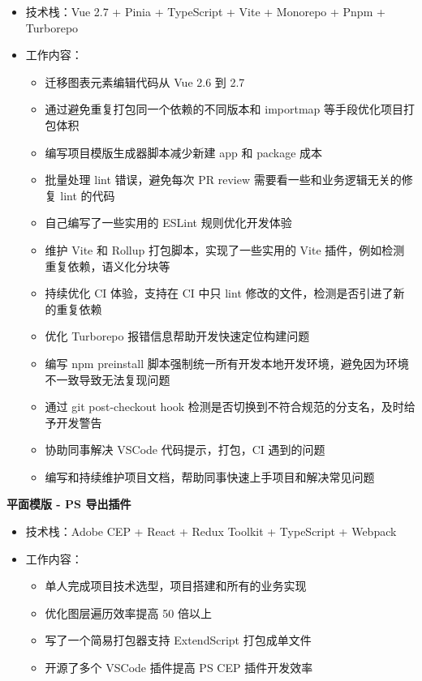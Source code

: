 \begin{itemize}
\item 技术栈：Vue 2.7 + Pinia + TypeScript + Vite + Monorepo + Pnpm + Turborepo
\item 工作内容：
  \begin{itemize}
    \item 迁移图表元素编辑代码从 Vue 2.6 到 2.7
    \item 通过避免重复打包同一个依赖的不同版本和 importmap 等手段优化项目打包体积
    \item 编写项目模版生成器脚本减少新建 app 和 package 成本
    \item 批量处理 lint 错误，避免每次 PR review 需要看一些和业务逻辑无关的修复 lint 的代码
    \item 自己编写了一些实用的 ESLint 规则优化开发体验
    \item 维护 Vite 和 Rollup 打包脚本，实现了一些实用的 Vite 插件，例如检测重复依赖，语义化分块等
    \item 持续优化 CI 体验，支持在 CI 中只 lint 修改的文件，检测是否引进了新的重复依赖
    \item 优化 Turborepo 报错信息帮助开发快速定位构建问题
    \item 编写 npm preinstall 脚本强制统一所有开发本地开发环境，避免因为环境不一致导致无法复现问题
    \item 通过 git post-checkout hook 检测是否切换到不符合规范的分支名，及时给予开发警告
    \item 协助同事解决 VSCode 代码提示，打包，CI 遇到的问题
    \item 编写和持续维护项目文档，帮助同事快速上手项目和解决常见问题
  \end{itemize}
\end{itemize}

\textbf{平面模版 - PS 导出插件}

\vspace{10pt}

\begin{itemize}
\item 技术栈：Adobe CEP + React + Redux Toolkit + TypeScript + Webpack
\item 工作内容：
  \begin{itemize}
    \item 单人完成项目技术选型，项目搭建和所有的业务实现
    \item 优化图层遍历效率提高 50 倍以上
    \item 写了一个简易打包器支持 ExtendScript 打包成单文件
    \item 开源了多个 VSCode 插件提高 PS CEP 插件开发效率
  \end{itemize}
\end{itemize}

